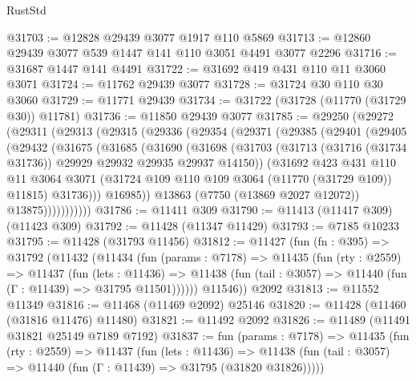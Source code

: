 \begin{lexlean}{RustStd}
\begin{coremodule}
@31703 := @12828 @29439 @3077 @1917 @110 @5869
@31713 := @12860 @29439 @3077 @539 @1447 @141 @110 @3051 @4491 @3077 @2296
@31716 := @31687 @1447 @141 @4491
@31722 := @31692 @419 @431 @110 @11 @3060 @3071
@31724 := @11762 @29439 @3077
@31728 := @31724 @30 @110 @30 @3060
@31729 := @11771 @29439
@31734 := @31722 (@31728 (@11770 (@31729 @30)) @11781)
@31736 := @11850 @29439 @3077
@31785 := @29250
    (@29272
      (@29311
        (@29313
          (@29315
            (@29336
              (@29354
                (@29371
                  (@29385
                    (@29401
                      (@29405
                        (@29432
                          (@31675
                            (@31685
                              (@31690
                                (@31698
                                  (@31703
                                    (@31713
                                      (@31716 (@31734 @31736))
                                      @29929
                                      @29932
                                      @29935
                                      @29937
                                      @14150))
                                  (@31692
                                    @423
                                    @431
                                    @110
                                    @11
                                    @3064
                                    @3071
                                    (@31724 @109 @110 @109 @3064 (@11770 (@31729 @109)) @11815)
                                    @31736)))
                              @16985))
                          @13863
                          (@7750 (@13869 @2027 @12072))
                          @13875)))))))))))
@31786 := @11411 @309
@31790 := @11413 (@11417 @309) (@11423 @309)
@31792 := @11428 (@11347 @11429)
@31793 := @7185 @10233
@31795 := @11428 (@31793 @11456)
@31812 := @11427
    (fun (fn : @395) =>
    @31792
      (@11432
        (@11434
          (fun (params : @7178) =>
          @11435
            (fun (rty : @2559) =>
            @11437
              (fun (lets : @11436) =>
              @11438 (fun (tail : @3057) => @11440 (fun (Γ : @11439) => @31795 @11501))))))
        @11546))
    @2092
@31813 := @11552 @11349
@31816 := @11468 (@11469 @2092) @25146
@31820 := @11428 (@11460 (@31816 @11476) @11480)
@31821 := @11492 @2092
@31826 := @11489 (@11491 @31821 @25149 @7189 @7192)
@31837 := fun (params : @7178) =>
  @11435
    (fun (rty : @2559) =>
    @11437
      (fun (lets : @11436) =>
      @11438 (fun (tail : @3057) => @11440 (fun (Γ : @11439) => @31795 (@31820 @31826)))))

\end{coremodule}
\end{lexlean}
